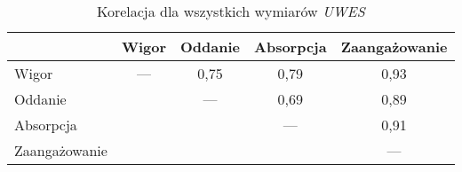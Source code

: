 \begin{table}[h!]
\begin{center}
\begin{tabular}{l || c c c | c}
 & Wigor & Oddanie & Absorpcja & Zaangażowanie \\ \hline \hline
Wigor & --- & 0,75 & 0,79 & 0,93 \\
Oddanie & & --- & 0,69 & 0,89 \\
Absorpcja & & & --- & 0,91 \\ \hline
Zaangażowanie & & & & --- \\
\end{tabular}
\end{center}
\label{tab:uwes-correl}
\caption{Korelacja dla wszystkich wymiarów \emph{UWES}}
\end{table}
